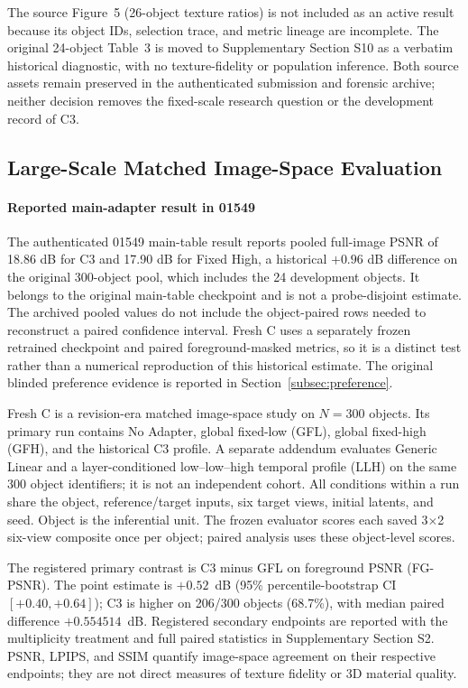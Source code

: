 \documentclass[times,twocolumn,final]{elsarticle}
\begin{document}
The source Figure~5 (26-object texture ratios) is not included as an active result because its object IDs, selection trace, and metric lineage are incomplete. The original 24-object Table~3 is moved to Supplementary Section S10 as a verbatim historical diagnostic, with no texture-fidelity or population inference. Both source assets remain preserved in the authenticated submission and forensic archive; neither decision removes the fixed-scale research question or the development record of C3.

\subsection{Large-Scale Matched Image-Space Evaluation}
\label{subsec:largescale}

\paragraph{Reported main-adapter result in 01549}
The authenticated 01549 main-table result reports pooled full-image PSNR of 18.86 dB for C3 and 17.90 dB for Fixed High, a historical $+0.96$ dB difference on the original 300-object pool, which includes the 24 development objects. It belongs to the original main-table checkpoint and is not a probe-disjoint estimate. The archived pooled values do not include the object-paired rows needed to reconstruct a paired confidence interval. Fresh C uses a separately frozen retrained checkpoint and paired foreground-masked metrics, so it is a distinct test rather than a numerical reproduction of this historical estimate. The original blinded preference evidence is reported in Section~\ref{subsec:preference}.

Fresh C is a revision-era matched image-space study on $N=300$ objects. Its primary run contains No Adapter, global fixed-low (GFL), global fixed-high (GFH), and the historical C3 profile. A separate addendum evaluates Generic Linear and a layer-conditioned low--low--high temporal profile (LLH) on the same 300 object identifiers; it is not an independent cohort. All conditions within a run share the object, reference/target inputs, six target views, initial latents, and seed. Object is the inferential unit. The frozen evaluator scores each saved 3$\times$2 six-view composite once per object; paired analysis uses these object-level scores.

The registered primary contrast is C3 minus GFL on foreground PSNR (FG-PSNR). The point estimate is $+0.52$~dB (95\% percentile-bootstrap CI $[+0.40,+0.64]$); C3 is higher on 206/300 objects (68.7\%), with median paired difference $+0.554514$~dB. Registered secondary endpoints are reported with the multiplicity treatment and full paired statistics in Supplementary Section S2. PSNR, LPIPS, and SSIM quantify image-space agreement on their respective endpoints; they are not direct measures of texture fidelity or 3D material quality.
\end{document}
